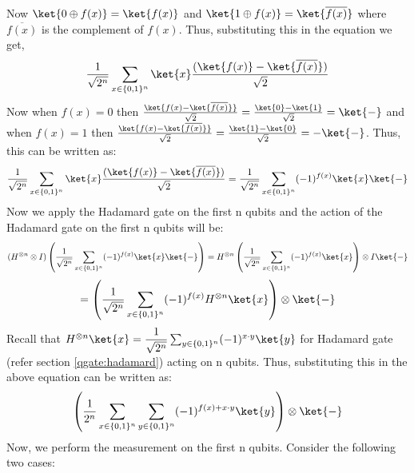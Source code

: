 \documentclass[12pt, oneside]{book}
\theoremstyle{definition}
\theoremstyle{definition}
\theoremstyle{remark}
\begin{document}
Now $\ket{0 \oplus f(x)}=\ket{f(x)}$ and $\ket{1 \oplus f(x)} = \ket{\overline{f(x)}}$ where $\overline{f(x)}$ is the complement of $f(x)$. Thus, substituting this in the equation we get,
\[
    \frac{1}{\sqrt{2^n}}\sum_{x \in \{0,1\}^n}\ket{x}\frac{(\ket{f(x)}-\ket{\overline{f(x)}})}{\sqrt{2}}
\] 
Now when $f(x)=0$ then $\frac{\ket{f(x)-\ket{\overline{f(x)}}}}{\sqrt{2}}=\frac{\ket{0}-\ket{1}}{\sqrt{2}}=\ket{-}$ and when $f(x)=1$ then $\frac{\ket{f(x)-\ket{\overline{f(x)}}}}{\sqrt{2}}=\frac{\ket{1}-\ket{0}}{\sqrt{2}}=-\ket{-}$.
Thus, this can be written as: 
\[
    \frac{1}{\sqrt{2^n}}\sum_{x \in \{0,1\}^n}\ket{x}\frac{(\ket{f(x)}-\ket{\overline{f(x)}})}{\sqrt{2}}=\frac{1}{\sqrt{2^n}}\sum_{x \in \{0,1\}^n}(-1)^{f(x)}\ket{x}\ket{-}
\]
Now we apply the Hadamard gate on the first n qubits and the action of the Hadamard gate on the first n qubits will be:
\[
    (H^{\otimes n}\otimes I)\left(\frac{1}{\sqrt{2^n}}\sum_{x \in \{0,1\}^n}(-1)^{f(x)}\ket{x}\ket{-}\right)=H^{\otimes n}\left(\frac{1}{\sqrt{2^n}}\sum_{x \in \{0,1\}^n}(-1)^{f(x)}\ket{x}\right)\otimes I\ket{-}
\]
\[
    =\left(\frac{1}{\sqrt{2^n}}\sum_{x \in \{0,1\}^n}(-1)^{f(x)}H^{\otimes n}\ket{x}\right)\otimes \ket{-}
\]
Recall that $H^{\otimes n}\ket{x}=\dfrac{1}{\sqrt{2^n}}\sum_{y \in \{0,1\}^n}(-1)^{x\cdot y}\ket{y}$ for Hadamard gate (refer section \ref{qgate:hadamard}) acting on n qubits. Thus, substituting this in the above equation can be written as:
\[
    \left(\frac{1}{2^n}\sum_{x \in \{0,1\}^n}\sum_{y \in \{0,1\}^n}(-1)^{f(x)+x\cdot y}\ket{y}\right)\otimes \ket{-}
\]
Now, we perform the measurement on the first n qubits. Consider the following two cases:
\end{document}
